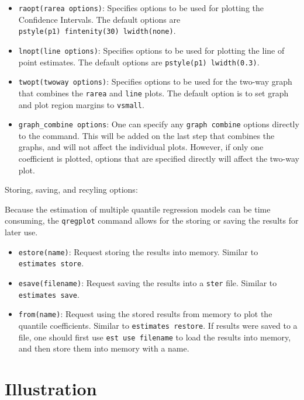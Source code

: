 \documentclass[bib]{statapress}
\providecommand{\tightlist}{%
  \setlength{\itemsep}{0pt}\setlength{\parskip}{0pt}}\usepackage{longtable,booktabs,array}
\begin{document}
\begin{itemize}
\tightlist
\item
  \texttt{raopt(rarea\ options)}: Specifies options to be used for
  plotting the Confidence Intervals. The default options are
  \texttt{pstyle(p1)\ fintenity(30)\ lwidth(none)}.
\item
  \texttt{lnopt(line\ options)}: Specifies options to be used for
  plotting the line of point estimates. The default options are
  \texttt{pstyle(p1)\ lwidth(0.3)}.
\item
  \texttt{twopt(twoway\ options)}: Specifies options to be used for the
  two-way graph that combines the \texttt{rarea} and \texttt{line}
  plots. The default option is to set graph and plot region margins to
  \texttt{vsmall}.
\item
  \texttt{graph\_combine\ options}: One can specify any
  \texttt{graph\ combine} options directly to the command. This will be
  added on the last step that combines the graphs, and will not affect
  the individual plots. However, if only one coefficient is plotted,
  options that are specified directly will affect the two-way plot.
\end{itemize}

Storing, saving, and recyling options:

Because the estimation of multiple quantile regression models can be
time consuming, the \texttt{qregplot} command allows for the storing or
saving the results for later use.

\begin{itemize}
\tightlist
\item
  \texttt{estore(name)}: Request storing the results into memory.
  Similar to \texttt{estimates\ store}.
\item
  \texttt{esave(filename)}: Request saving the results into a
  \texttt{ster} file. Similar to \texttt{estimates\ save}.
\item
  \texttt{from(name)}: Request using the stored results from memory to
  plot the quantile coefficients. Similar to
  \texttt{estimates\ restore}. If results were saved to a file, one
  should first use \texttt{est\ use\ filename} to load the results into
  memory, and then store them into memory with a name.
\end{itemize}

\section{Illustration}\label{illustration}
\end{document}
